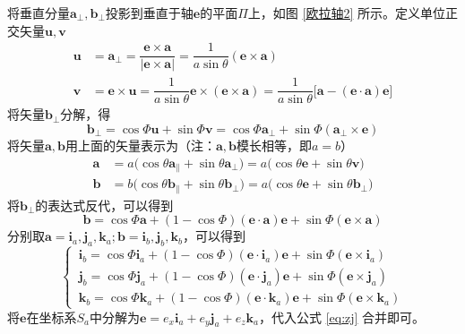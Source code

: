 \noindent 将垂直分量$\bm{a}_{\perp}, \bm{b}_{\perp}$投影到垂直于轴$\bm{e}$的平面$\Pi$上，如图 \ref{欧拉轴2} 所示。定义单位正交矢量$\bm{u}, \bm{v}$
\begin{align*}
	\bm{u} & = \bm{a}_{\perp} = \dfrac{\bm{e} \times \bm{a}}{\big| \bm{e} \times \bm{a} \big|} = \dfrac{1}{a \sin \theta}(\bm{e} \times \bm{a}) \\
	\bm{v} & = \bm{e} \times \bm{u} = \dfrac{1}{a \sin \theta} \bm{e} \times (\bm{e} \times \bm{a})= \dfrac{1}{a \sin \theta}\big[ \bm{a} - (\bm{e} \cdot \bm{a})\bm{e} \big] 
\end{align*}
将矢量$\bm{b}_{\perp}$分解，得
\begin{equation*}
	\bm{b}_{\perp} = \cos \varPhi \bm{u} + \sin \varPhi \bm{v} = \cos \varPhi \bm{a}_\perp + \sin \varPhi (\bm{a}_\perp \times \bm{e})
\end{equation*}
将矢量$\bm{a}, \bm{b}$用上面的矢量表示为（注：$\bm{a}, \bm{b}$模长相等，即$a=b$）
\begin{align}
	\bm{a} & = a \big( \cos \theta \bm{a}_{\parallel} + \sin \theta \bm{a}_{\perp} \big) 
	= a \big( \cos \theta \bm{e} + \sin \theta \bm{v} \big) \\
	\bm{b} & = b \big( \cos \theta \bm{b}_{\parallel} + \sin \theta \bm{b}_{\perp} \big) 
	= a \big( \cos \theta \bm{e} + \sin \theta \bm{b}_{\perp} \big)
\end{align}
将$\bm{b}_{\perp}$的表达式反代，可以得到
\begin{equation}
	\bm{b} = \cos \varPhi \bm{a} + ( 1 - \cos \varPhi ) (\bm{e} \cdot \bm{a})\bm{e} + \sin \varPhi(\bm{e} \times \bm{a})
\end{equation}
分别取$\bm{a} = \bm{i}_a, \bm{j}_a, \bm{k}_a; \bm{b} = \bm{i}_b, \bm{j}_b, \bm{k}_b$，可以得到
\begin{equation}
	\begin{cases}
		\, \bm{i}_b = \cos \varPhi \bm{i}_a+ ( 1 - \cos \varPhi ) (\bm{e} \cdot \bm{i}_a)\bm{e} + \sin \varPhi(\bm{e} \times \bm{i}_a) \\
		\, \bm{j}_b = \cos \varPhi \bm{j}_a+ ( 1 - \cos \varPhi ) (\bm{e} \cdot \bm{j}_a)\bm{e} + \sin \varPhi(\bm{e} \times \bm{j}_a) \\
		\, \bm{k}_b = \cos \varPhi \bm{k}_a+ ( 1 - \cos \varPhi ) (\bm{e} \cdot \bm{k}_a)\bm{e} + \sin \varPhi(\bm{e} \times \bm{k}_a)
	\end{cases}
	\label{eq:zj}
\end{equation}
将$\bm{e}$在坐标系$S_a$中分解为$\bm{e} = e_x \bm{i}_a + e_y \bm{j}_a + e_z \bm{k}_a $，代入公式 \eqref{eq:zj} 合并即可。
\vspace*{0.8em}


